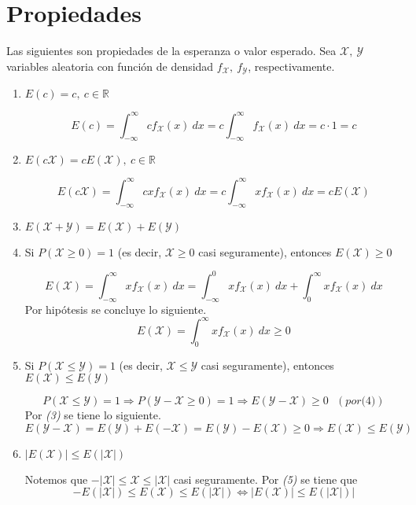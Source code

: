 \section{Propiedades}
Las siguientes son propiedades de la esperanza o valor esperado. Sea $\mathcal X,~ \mathcal Y$ variables aleatoria con función de densidad $f_{\mathcal X},~ f_{\mathcal Y}$, respectivamente.
\begin{enumerate}
  \item $E(c) = c,~ c \in \mathbb R$
    \begin{myproof}
      \[E(c) = \int_{-\infty}^{\infty} c f_{\mathcal X}(x)~dx = c \int_{-\infty}^{\infty} f_{\mathcal X}(x)~dx = c \cdot 1 = c\]
    \end{myproof}
  \item $E(c \mathcal X) = c E(\mathcal X),~ c \in \mathbb R$
    \begin{myproof}
      \[E(c\mathcal X) = \int_{-\infty}^{\infty} cx f_{\mathcal X}(x)~dx = c \int_{-\infty}^{\infty} xf_{\mathcal X}(x)~dx = c E(\mathcal X)\]
    \end{myproof}
  \item $E(\mathcal X + \mathcal Y) = E(\mathcal X) + E(\mathcal Y)$
  \item Si $P(\mathcal X \ge 0) = 1$ (es decir, $\mathcal X \ge 0$ casi seguramente), entonces $E(\mathcal X) \ge 0$
    \begin{myproof}
      \[E(\mathcal X) = \int_{-\infty}^{\infty} x f_{\mathcal X}(x)~dx = \int_{-\infty}^{0} xf_{\mathcal X}(x)~dx + \int_{0}^{\infty} xf_{\mathcal X}(x)~dx\]
      Por hipótesis se concluye lo siguiente.
      \[E(\mathcal X) = \int_{0}^{\infty} xf_{\mathcal X}(x)~dx \ge 0\]
    \end{myproof}
  \item Si $P(\mathcal X \le \mathcal Y) = 1$ (es decir, $\mathcal X \le \mathcal Y$ casi seguramente), entonces $E(\mathcal X) \le E(\mathcal Y)$
    \begin{myproof}
      \[P(\mathcal X \le \mathcal Y) = 1 \Longrightarrow P(\mathcal Y - \mathcal X \ge 0) = 1 \Longrightarrow E(\mathcal Y - \mathcal X) \ge 0 ~~~(por \textit{(4)})\]
      Por \textit{(3)} se tiene lo siguiente.
      \[E(\mathcal Y - \mathcal X) = E(\mathcal Y) + E(\mathcal {-X}) = E(\mathcal Y) - E(\mathcal X) \ge 0 \Longrightarrow E(\mathcal X) \le E(\mathcal Y) \]
    \end{myproof}
  \item $|E(\mathcal X)| \le E(|\mathcal X|)$
    \begin{myproof}
      Notemos que $- |\mathcal X| \le \mathcal X \le |\mathcal X|$ casi seguramente.
      Por \textit{(5)} se tiene que
      \[-E(|\mathcal X|) \le E(\mathcal X) \le E(|\mathcal X|)
        \Longleftrightarrow
      |E(\mathcal X)| \le E(|\mathcal X|)|\]
    \end{myproof}
\end{enumerate}


